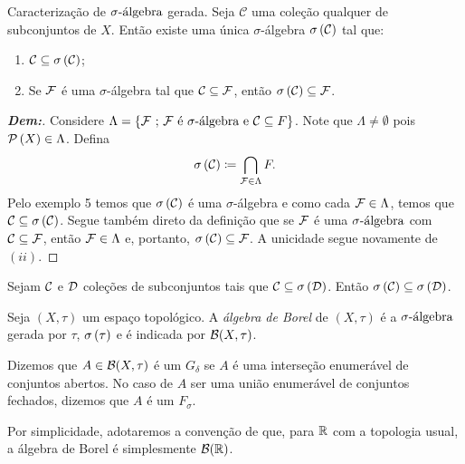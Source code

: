 \newpage
\begin{prop*}{Caracterização de $\sigmaalg$ gerada.}
  Seja $\mathscr C$ uma coleção qualquer de subconjuntos de $X$. Então
  existe uma única $\sigma$-álgebra $\sigg{\mcal C}$ tal que:
  \begin{enumerate}[label=(\roman*)]
    \item  $\mcal C \subseteq \siggmc C$;
    \item Se $\mcal F$ é uma $\sigma$-álgebra tal que $\mcal C \subseteq \mcal F$,
      então $\siggmc C \subseteq \mcal F$.
  \end{enumerate}
\end{prop*}
\begin{proof}[\textbf{Dem:}] Considere $\Lambda = \set{\mcal F \st \mcal F 
  \text{ é $\sigma$-álgebra e } \mcal C \subseteq F} $. Note que $\Lambda \neq \emptyset$
  pois $\pset X \in \Lambda$. Defina $$\siggmc C \coloneq \mycap{\mcal F} \Lambda F.$$ 
  Pelo exemplo 5 temos que $\siggmc C$ é uma $\sigma$-álgebra e como cada 
  $\mcal F \in \Lambda$, temos que $\mcal C \subseteq \siggmc C$. 
  Segue também direto da definição que se $\mcal F$ é uma $\sigmaalg$ com 
  $\mcal C \subseteq \mcal F$, então $\mcal F \in \Lambda$ e, portanto, $\siggmc C \subseteq 
  \mcal F$. A unicidade segue novamente de $(ii)$.
\end{proof}

\begin{corollary*}{}
  Sejam $\mcal C$ e $\mcal D$ coleções de subconjuntos tais que $\mcal C \subseteq \siggmc D$. 
  Então $\siggmc C \subseteq \siggmc D$.
\end{corollary*}

\begin{definition*}{}
  Seja $(X, \tau)$ um espaço topológico. A \textit{álgebra de Borel} de $(X,\tau)$ é 
  a $\sigmaalg$ gerada por $\tau$, $\sigg \tau$ e é indicada por $\borel{X, \tau}$. 
\end{definition*}
\vspace{5mm}

Dizemos que $A \in \borel{X, \tau}$ é um $G_\delta$ se $A$ é uma interseção 
enumerável de conjuntos abertos. No caso de $A$ ser uma união enumerável 
de conjuntos fechados, dizemos que $A$ é um $F_\sigma$.

Por simplicidade, adotaremos a convenção de que, para $\bR$ com a topologia usual, 
a álgebra de Borel é simplesmente $\borelR$.

